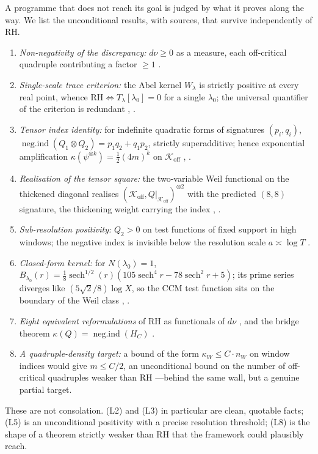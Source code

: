 \documentclass[11pt]{amsart}
\theoremstyle{definition}
\theoremstyle{remark}
\newcommand{\RH}{\mathrm{RH}}
\newcommand{\Koff}{\mathcal{K}_{\mathrm{off}}}
\newcommand{\negind}{\operatorname{neg.ind}}
\newcommand{\dnu}{d\nu}
\newcommand{\Tl}{T_\lambda}
\begin{document}
A programme that does not reach its goal is judged by what it proves along the
way. We list the unconditional results, with sources, that survive
independently of RH.

\begin{enumerate}[\rm(L1)]
\item \emph{Non-negativity of the discrepancy:} $\dnu\ge0$ as a measure,
each off-critical quadruple contributing a factor $\ge1$
\cite[]{P40}.
\item \emph{Single-scale trace criterion:} the Abel kernel $W_\lambda$ is
strictly positive at every real point, whence $\RH\iff\Tl[\lambda_0]=0$ for a
single $\lambda_0$; the universal quantifier of the criterion is redundant
\cite[]{P40}, \cite[Thm~3.2]{P41}.
\item \emph{Tensor index identity:} for indefinite quadratic forms of
signatures $(p_i,q_i)$, $\negind(Q_1\otimes Q_2)=p_1q_2+q_1p_2$, strictly
superadditive; hence exponential amplification $\kappa(\psi^{\otimes k})=
\tfrac12(4m)^k$ on $\Koff$ \cite[]{P40}, \cite[Thm~4.2--4.3]{P42}.
\item \emph{Realisation of the tensor square:} the two-variable Weil
functional on the thickened diagonal realises
$(\Koff,Q|_{\Koff})^{\otimes2}$ with the predicted $(8,8)$ signature, the
thickening weight carrying the index \cite[]{P40}, \cite[Thm~5.4]{P42}.
\item \emph{Sub-resolution positivity:} $Q_2>0$ on test functions of fixed
support in high windows; the negative index is invisible below the resolution
scale $a\asymp\log T$ \cite[Thm~3.3]{P40}.
\item \emph{Closed-form kernel:} for $N(\lambda_0)=1$,
$B_{\lambda_0}(r)=\tfrac18\operatorname{sech}^{1/2}(r)
(105\operatorname{sech}^4 r-78\operatorname{sech}^2 r+5)$; its prime series
diverges like $(5\sqrt2/8)\log X$, so the CCM test function sits on the
boundary of the Weil class \cite[]{P40}, \cite[\S3]{P42}.
\item \emph{Eight equivalent reformulations} of RH as functionals of $\dnu$
\cite[]{P40}, and the bridge theorem $\kappa(Q)=\negind(H_C)$
\cite{P35}.
\item \emph{A quadruple-density target:} a bound of the form
$\kappa_W\le C\cdot n_W$ on window indices would give $m\le C/2$, an
unconditional bound on the number of off-critical quadruples weaker than RH
\cite[\S8.2]{P40}---behind the same wall, but a genuine partial
target.
\end{enumerate}

These are not consolation. (L2) and (L3) in particular are clean, quotable
facts; (L5) is an unconditional positivity with a precise resolution
threshold; (L8) is the shape of a theorem strictly weaker than RH that the
framework could plausibly reach.
\end{document}
